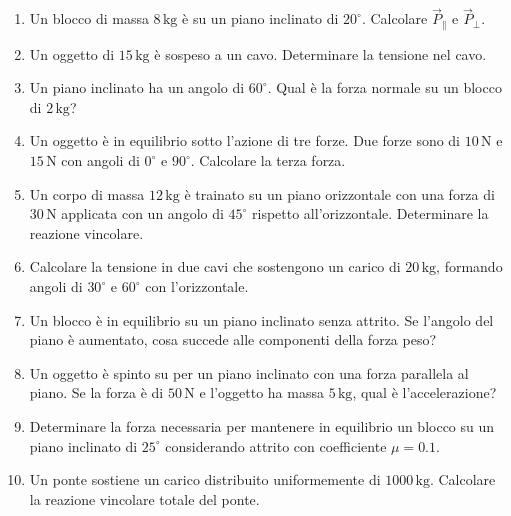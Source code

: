 \documentclass[a4paper,12pt]{article}
\begin{document}
\begin{enumerate}
    \item Un blocco di massa $8\,\text{kg}$ è su un piano inclinato di $20^\circ$. Calcolare $\vec{P}_\parallel$ e $\vec{P}_\perp$.
    \item Un oggetto di $15\,\text{kg}$ è sospeso a un cavo. Determinare la tensione nel cavo.
    \item Un piano inclinato ha un angolo di $60^\circ$. Qual è la forza normale su un blocco di $2\,\text{kg}$?
    \item Un oggetto è in equilibrio sotto l'azione di tre forze. Due forze sono di $10\,\text{N}$ e $15\,\text{N}$ con angoli di $0^\circ$ e $90^\circ$. Calcolare la terza forza.
    \item Un corpo di massa $12\,\text{kg}$ è trainato su un piano orizzontale con una forza di $30\,\text{N}$ applicata con un angolo di $45^\circ$ rispetto all'orizzontale. Determinare la reazione vincolare.
    \item Calcolare la tensione in due cavi che sostengono un carico di $20\,\text{kg}$, formando angoli di $30^\circ$ e $60^\circ$ con l'orizzontale.
    \item Un blocco è in equilibrio su un piano inclinato senza attrito. Se l'angolo del piano è aumentato, cosa succede alle componenti della forza peso?
    \item Un oggetto è spinto su per un piano inclinato con una forza parallela al piano. Se la forza è di $50\,\text{N}$ e l'oggetto ha massa $5\,\text{kg}$, qual è l'accelerazione?
    \item Determinare la forza necessaria per mantenere in equilibrio un blocco su un piano inclinato di $25^\circ$ considerando attrito con coefficiente $\mu = 0.1$.
    \item Un ponte sostiene un carico distribuito uniformemente di $1000\,\text{kg}$. Calcolare la reazione vincolare totale del ponte.
\end{enumerate}
\end{document}
